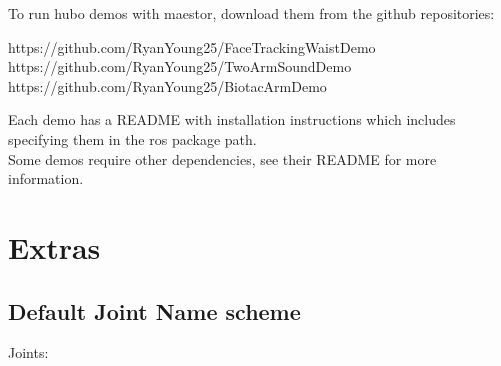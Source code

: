 \documentclass[12pt]{article}
\begin{document}
To run hubo demos with maestor, download them from the github repositories: 

	\begin{flushleft}
		https://github.com/RyanYoung25/FaceTrackingWaistDemo
		https://github.com/RyanYoung25/TwoArmSoundDemo
		https://github.com/RyanYoung25/BiotacArmDemo
	\end{flushleft}


Each demo has a README with installation instructions which includes specifying them in the ros package path. \\

Some demos require other dependencies, see their README for more information. 

\section{Extras}

\subsection{Default Joint Name scheme}

Joints:\\
\end{document}
